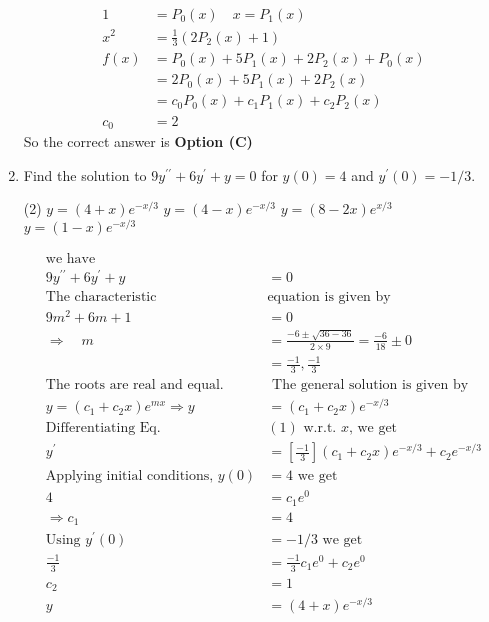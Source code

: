 \begin{enumerate}[label=\color{ocre}\textbf{\arabic*.}]
\begin{answer}
$$\begin{aligned}
	1&=P_{0}(x) \quad x=P_{1}(x)\\
	x^{2}&=\frac{1}{3}\left(2 P_{2}(x)+1\right)\\
	f(x)&=P_{0}(x)+5 P_{1}(x)+2 P_{2}(x)+P_{0}(x)\\
	&=2 P_{0}(x)+5 P_{1}(x)+2 P_{2}(x)\\
	&=c_{0} P_{0}(x)+c_{1} P_{1}(x)+c_{2} P_{2}(x)\\ c_{0}&=2
	\end{aligned}
	$$
	So the correct answer is \textbf{Option (C)}
\end{answer}
\item Find the solution to $9 y^{\prime \prime}+6 y^{\prime}+y=0$ for $y(0)=4$ and $y^{\prime}(0)=-1 / 3$.
\begin{tasks}(2)
	\task[\textbf{a.}]$y=(4+x) e^{-x / 3}$
	\task[\textbf{b.}]$y=(4-x) e^{-x / 3}$
	\task[\textbf{c.}]$y=(8-2 x) e^{x / 3}$
	\task[\textbf{d.}]$y=(1-x) e^{-x / 3}$ 
\end{tasks}
\begin{answer}
	$$
	\begin{aligned}
	\text{we have}&\\
	9 y^{\prime \prime}+6 y^{\prime}+y&=0\\
	\text{The characteristic }&\text{equation is given by}\\
	9 m^{2}+6 m+1&=0 \\
	\Rightarrow \quad m&=\frac{-6 \pm \sqrt{36-36}}{2 \times 9}=\frac{-6}{18} \pm 0 \\
	&=\frac{-1}{3}, \frac{-1}{3}\\
	\text{The roots are real and equal.}&\text{ The general solution is given by}\\
	y=\left(c_{1}+c_{2} x\right) e^{m x} \Rightarrow y&=\left(c_{1}+c_{2} x\right) e^{-x / 3}\\
	\text{Differentiating Eq. }&(1)\text{ w.r.t. $x$, we get}\\
	y^{\prime}&=\left[\frac{-1}{3}\right]\left(c_{1}+c_{2} x\right) e^{-x / 3}+c_{2} e^{-x / 3}\\
	\text{Applying initial conditions, }y(0)&=4  \text{ we get}\\
	4 &= c_{1}e^{0}\\
	\Rightarrow c_{1} &=4\\
	\text{Using }y^{\prime}(0)&=-1 / 3\text{ we get}\\
	\frac{-1}{3}&=\frac{-1}{3} c_{1}e^{0}+c_{2} e^{0}\\
	c_{2}&=1\\
	y&=(4+x) e^{-x / 3}
	\end{aligned}
$$
\end{answer}
\end{enumerate}

